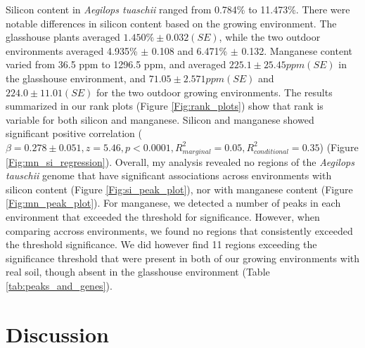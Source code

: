 \documentclass[12pt, letterpaper, ]{report}
\begin{document}
 Silicon content in \textit{Aegilops tuaschii} ranged from 0.784\% to 11.473\%. There were notable differences in silicon content based on the growing environment. The glasshouse plants averaged $1.450\% \pm 0.032 (SE)$, while the two outdoor environments averaged 4.935\% $\pm$ 0.108 and 6.471\% $\pm$ 0.132. Manganese content varied from 36.5 ppm to 1296.5 ppm, and averaged $225.1 \pm 25.45 ppm (SE)$ in the glasshouse environment, and $ 71.05 \pm 2.571 ppm (SE)$ and $ 224.0 \pm 11.01 (SE)$ for the two outdoor growing environments. The results summarized in our rank plots (Figure \ref{Fig:rank_plots}) show that rank is variable for both silicon and manganese. Silicon and manganese showed significant positive correlation ($\beta = 0.278 \pm 0.051, z = 5.46, p<0.0001, R^2_{marginal} = 0.05, R^2_{conditional} = 0.35 $) (Figure \ref{Fig:mn_si_regression}). Overall, my analysis revealed no regions of the \textit{Aegilops tauschii} genome that have significant associations across environments with silicon content (Figure \ref{Fig:si_peak_plot}), nor with manganese content (Figure \ref{Fig:mn_peak_plot}). For manganese, we detected a number of peaks in each environment that exceeded the threshold for significance. However, when comparing accross environments, we found no regions that consistently exceeded the threshold significance. We did however find 11 regions exceeding the significance threshold that were present in both of our growing environments with real soil, though absent in the glasshouse environment (Table \ref{tab:peaks_and_genes}). 

\section{Discussion}
\end{document}

